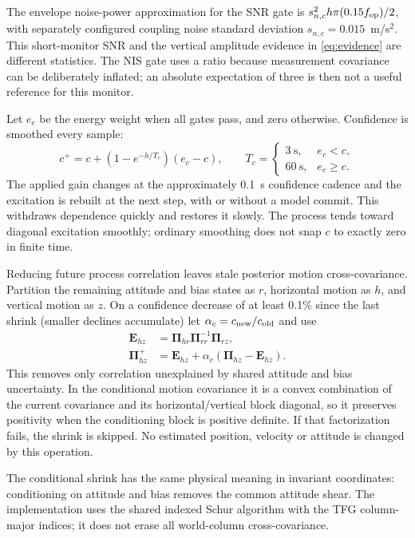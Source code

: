 \documentclass[conference]{IEEEtran}
\newcommand{\mt}[1]{\bm{#1}}
\begin{document}
The envelope noise-power approximation for the SNR gate is
$s_{n,c}^2 h\pi(0.15f_{\rm op})/2$, with separately configured coupling
noise standard deviation $s_{n,c}=0.015$~m/s$^2$. This short-monitor SNR
and the vertical amplitude evidence in \cref{eq:evidence} are different
statistics. The NIS gate uses a ratio because measurement covariance can
be deliberately inflated; an absolute expectation of three is then not
a useful reference for this monitor.

Let $e_c$ be the energy weight when all gates pass, and zero otherwise.
Confidence is smoothed every sample:
\begin{equation}
 c^+=c+(1-e^{-h/T_c})(e_c-c),\qquad
 T_c=\begin{cases}3~\mathrm s,&e_c<c,\\60~\mathrm s,&e_c\ge c.\end{cases}
 \label{eq:confidence}
\end{equation}
The applied gain changes at the approximately 0.1~s confidence cadence
and the excitation is rebuilt at the next step, with or without a model
commit. This
withdraws dependence quickly and restores it slowly. The process tends
toward diagonal excitation smoothly; ordinary smoothing does not snap
$c$ to exactly zero in finite time.

Reducing future process correlation leaves stale posterior motion
cross-covariance. Partition the remaining attitude and bias states as
$r$, horizontal motion as $h$, and vertical motion as $z$. On a confidence
decrease of at least 0.1\% since the last shrink (smaller declines
accumulate) let $\alpha_c=c_{\rm new}/c_{\rm old}$ and use
\begin{align}
 \mt E_{hz}&=\mt\Pi_{hr}\mt\Pi_{rr}^{-1}\mt\Pi_{rz},\nonumber\\
 \mt\Pi_{hz}^+&=\mt E_{hz}+
                \alpha_c(\mt\Pi_{hz}-\mt E_{hz}).
 \label{eq:shrink}
\end{align}
This removes only correlation unexplained by shared attitude and bias
uncertainty. In the conditional motion covariance it is a convex
combination of the current covariance and its horizontal/vertical block
diagonal, so it preserves positivity when the conditioning block is
positive definite. If that factorization fails, the shrink is skipped.
No estimated position, velocity or attitude is changed by this operation.


The conditional shrink has the same physical meaning in invariant coordinates:
conditioning on attitude and bias removes the common attitude shear. The
implementation uses the shared indexed Schur algorithm with the TFG
column-major indices; it does not erase all world-column cross-covariance.
\end{document}
